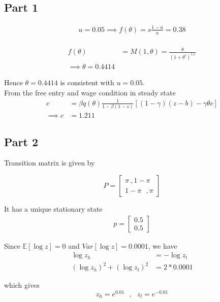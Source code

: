 
\subsection*{Part 1}

\begin{align*}
    u = 0.05 \implies f(\theta) = s\frac{1-u}{u} = 0.38\\
\end{align*}

\begin{align*}
    f(\theta) &= M(1, \theta) = \frac{\theta}{(1+\theta^\iota)^{1/\iota}}\\
    \implies \theta = 0.4414
\end{align*}

Hence $\theta = 0.4414$ is consistent with $u = 0.05$.\\

From the free entry and wage condition in steady state
\begin{align*}
    c &= \beta q(\theta) \frac{1}{1 - \beta(1 - s)} [(1 - \gamma)(z - b) - \gamma \theta c]\\
    \implies c &= 1.211
\end{align*}


\subsection*{Part 2}
Transition matrix is given by

\begin{equation*}
    P = \begin{bmatrix}
        \pi~, 1-\pi \\
        1- \pi~~~, \pi
    \end{bmatrix}
\end{equation*}

It has a unique stationary state 
\begin{align*}
    p = \begin{bmatrix}
        0.5 \\ 
        0.5
    \end{bmatrix}
\end{align*}

Since $\mathbb E[\log z] = 0$ and $Var[\log z] = 0.0001$, we have 
\begin{align*}
    \log z_h &= -\log z_l\\
    (\log z_h)^2 + (\log z_l)^2 &= 2*0.0001
\end{align*}

which gives 
$$ z_h = e^{0.01}~~~,~~~ z_l = e^{-0.01}$$

